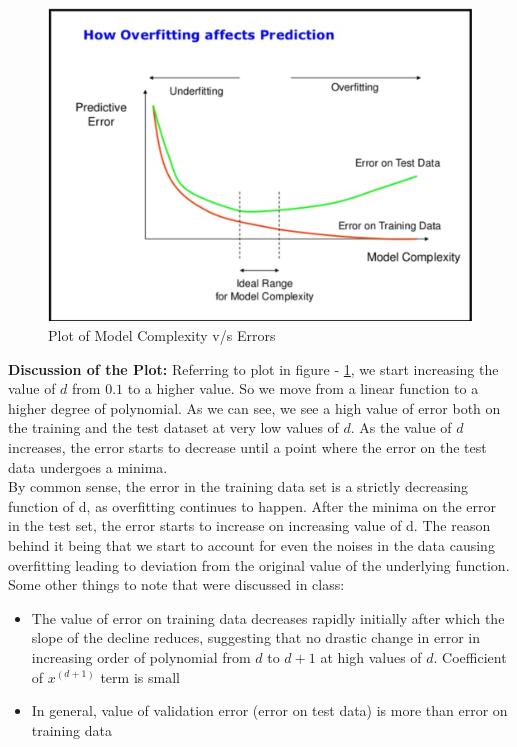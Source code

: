 \documentclass[12pt]{article}
\begin{document}
\begin{figure}[H]
    \centering
    \includegraphics[width=\linewidth]{Model Complexity v_s Errors.png}
    \caption{Plot of Model Complexity v/s Errors}
    \label{fig:mcvse}
\end{figure} 

\noindent
\textbf{Discussion of the Plot:}\newline
Referring to plot in figure - \ref{fig:mcvse}, we start increasing the value of $d$ from $0.1$ to a higher value. So we move from a linear function to a higher degree of polynomial. As we can see, we see a high value of error both on the training and the test dataset at very low values of $d$. As the value of $d$ increases, the error starts to decrease until a point where the error on the test data undergoes a minima. 
\\ By common sense, the error in the training data set is a strictly decreasing function of d, as overfitting continues to happen. After the minima on the error in the test set, the error starts to increase on increasing value of d. The reason behind it being that we start to account for even the noises in the data causing overfitting leading to deviation from the original value of the underlying function. Some other things to note that were discussed in class:
\begin{itemize}
    \item The value of error on training data decreases rapidly initially after which the slope of the decline reduces, suggesting that no drastic change in error in increasing order of polynomial from $d$ to $d+1$ at high values of $d$. Coefficient of $x^{(d+1)}$ term is small
    \item In general, value of validation error (error on test data) is more than error on training data
\end{itemize}
\end{document}

